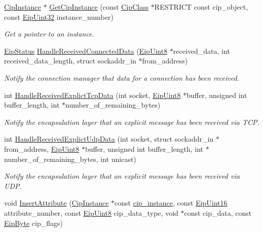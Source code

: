\begin{DoxyCompactItemize}
\hyperlink{ciptypes_8h_aea7976be629e5ece275c993982186188}{\-Cip\-Instance} $\ast$ \hyperlink{group__CIP__API_gaa50395aca91b378c297d6ad919df210e}{\-Get\-Cip\-Instance} (const \hyperlink{ciptypes_8h_a175191808b8fac50b47d9bbc9edc6051}{\-Cip\-Class} $\ast$\-R\-E\-S\-T\-R\-I\-C\-T const cip\-\_\-object, const \hyperlink{typedefs_8h_abf2dd49262551294eb990ef8746a2767}{\-Eip\-Uint32} instance\-\_\-number)
\begin{DoxyCompactList}\small\item\em \-Get a pointer to an instance. \end{DoxyCompactList}\item 
\hyperlink{typedefs_8h_a3dcc5f7837c120360f8cc88a76781709}{\-Eip\-Status} \hyperlink{group__CIP__API_ga34f1582ed424a2c875b8a317d828e181}{\-Handle\-Received\-Connected\-Data} (\hyperlink{typedefs_8h_aa0c108ee762a27720919a4634643040e}{\-Eip\-Uint8} $\ast$received\-\_\-data, int received\-\_\-data\-\_\-length, struct sockaddr\-\_\-in $\ast$from\-\_\-address)
\begin{DoxyCompactList}\small\item\em \-Notify the connection manager that data for a connection has been received. \end{DoxyCompactList}\item 
int \hyperlink{group__CIP__API_gacbbc9669d41357e1c8497c34ee8eeffb}{\-Handle\-Received\-Explict\-Tcp\-Data} (int socket, \hyperlink{typedefs_8h_aa0c108ee762a27720919a4634643040e}{\-Eip\-Uint8} $\ast$buffer, unsigned int buffer\-\_\-length, int $\ast$number\-\_\-of\-\_\-remaining\-\_\-bytes)
\begin{DoxyCompactList}\small\item\em \-Notify the encapsulation layer that an explicit message has been received via \-T\-C\-P. \end{DoxyCompactList}\item 
int \hyperlink{group__CIP__API_gad2fa74193023adadbbffe5bf0ef7f6ee}{\-Handle\-Received\-Explict\-Udp\-Data} (int socket, struct sockaddr\-\_\-in $\ast$from\-\_\-address, \hyperlink{typedefs_8h_aa0c108ee762a27720919a4634643040e}{\-Eip\-Uint8} $\ast$buffer, unsigned int buffer\-\_\-length, int $\ast$number\-\_\-of\-\_\-remaining\-\_\-bytes, int unicast)
\begin{DoxyCompactList}\small\item\em \-Notify the encapsulation layer that an explicit message has been received via \-U\-D\-P. \end{DoxyCompactList}\item 
void \hyperlink{group__CIP__API_gac207feb53c1f98b45f3934bbea63d618}{\-Insert\-Attribute} (\hyperlink{ciptypes_8h_aea7976be629e5ece275c993982186188}{\-Cip\-Instance} $\ast$const \hyperlink{structcip__instance}{cip\-\_\-instance}, const \hyperlink{typedefs_8h_ac1b4cfa25b4f5def62f23b455dd395d8}{\-Eip\-Uint16} attribute\-\_\-number, const \hyperlink{typedefs_8h_aa0c108ee762a27720919a4634643040e}{\-Eip\-Uint8} cip\-\_\-data\-\_\-type, void $\ast$const cip\-\_\-data, const \hyperlink{typedefs_8h_a168bac8db7e7e6d944700e1ac4717ae3}{\-Eip\-Byte} cip\-\_\-flags)

\end{DoxyCompactItemize}
